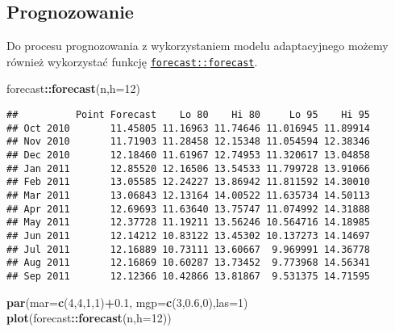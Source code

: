 \documentclass[polish,]{book}
\newenvironment{Shaded}{\begin{snugshade}}{\end{snugshade}}
\newcommand{\DataTypeTok}[1]{\textcolor[rgb]{0.13,0.29,0.53}{#1}}
\newcommand{\DecValTok}[1]{\textcolor[rgb]{0.00,0.00,0.81}{#1}}
\newcommand{\FloatTok}[1]{\textcolor[rgb]{0.00,0.00,0.81}{#1}}
\newcommand{\KeywordTok}[1]{\textcolor[rgb]{0.13,0.29,0.53}{\textbf{#1}}}
\newcommand{\NormalTok}[1]{#1}
\newcommand{\OperatorTok}[1]{\textcolor[rgb]{0.81,0.36,0.00}{\textbf{#1}}}
\begin{document}
\hypertarget{part_742}{%
\subsection{Prognozowanie}\label{part_742}}

Do procesu prognozowania z wykorzystaniem modelu adaptacyjnego możemy również wykorzystać funkcję \href{https://rdrr.io/cran/forecast/man/forecast.html}{\texttt{forecast::forecast}}.

\begin{Shaded}
\begin{Highlighting}[]
\NormalTok{forecast}\OperatorTok{::}\KeywordTok{forecast}\NormalTok{(n,}\DataTypeTok{h=}\DecValTok{12}\NormalTok{)}
\end{Highlighting}
\end{Shaded}

\begin{verbatim}
##          Point Forecast    Lo 80    Hi 80     Lo 95    Hi 95
## Oct 2010       11.45805 11.16963 11.74646 11.016945 11.89914
## Nov 2010       11.71903 11.28458 12.15348 11.054594 12.38346
## Dec 2010       12.18460 11.61967 12.74953 11.320617 13.04858
## Jan 2011       12.85520 12.16506 13.54533 11.799728 13.91066
## Feb 2011       13.05585 12.24227 13.86942 11.811592 14.30010
## Mar 2011       13.06843 12.13164 14.00522 11.635734 14.50113
## Apr 2011       12.69693 11.63640 13.75747 11.074992 14.31888
## May 2011       12.37728 11.19211 13.56246 10.564716 14.18985
## Jun 2011       12.14212 10.83122 13.45302 10.137273 14.14697
## Jul 2011       12.16889 10.73111 13.60667  9.969991 14.36778
## Aug 2011       12.16869 10.60287 13.73452  9.773968 14.56341
## Sep 2011       12.12366 10.42866 13.81867  9.531375 14.71595
\end{verbatim}

\begin{Shaded}
\begin{Highlighting}[]
\KeywordTok{par}\NormalTok{(}\DataTypeTok{mar=}\KeywordTok{c}\NormalTok{(}\DecValTok{4}\NormalTok{,}\DecValTok{4}\NormalTok{,}\DecValTok{1}\NormalTok{,}\DecValTok{1}\NormalTok{)}\OperatorTok{+}\FloatTok{0.1}\NormalTok{, }\DataTypeTok{mgp=}\KeywordTok{c}\NormalTok{(}\DecValTok{3}\NormalTok{,}\FloatTok{0.6}\NormalTok{,}\DecValTok{0}\NormalTok{),}\DataTypeTok{las=}\DecValTok{1}\NormalTok{)}
\KeywordTok{plot}\NormalTok{(forecast}\OperatorTok{::}\KeywordTok{forecast}\NormalTok{(n,}\DataTypeTok{h=}\DecValTok{12}\NormalTok{))}
\end{Highlighting}
\end{Shaded}
\end{document}
